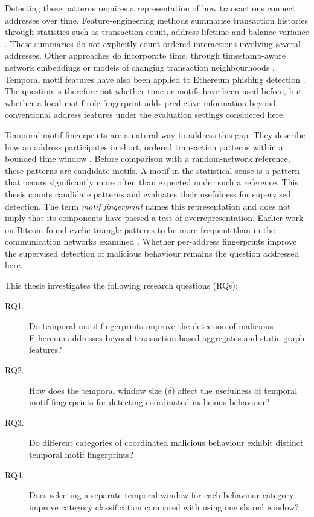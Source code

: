 \documentclass{thesisclass}
\begin{document}
Detecting these patterns requires a representation of how transactions connect addresses over time. Feature-engineering methods summarise transaction histories through statistics such as transaction count, address lifetime and balance variance \citep{chen2022phishing, alemari2021labeled}. These summaries do not explicitly count ordered interactions involving several addresses. Other approaches do incorporate time, through timestamp-aware network embeddings or models of changing transaction neighbourhoods \citep{wu2020phishers, ghoshcatalog2025}. Temporal motif features have also been applied to Ethereum phishing detection \citep{wang2023temporal}. The question is therefore not whether time or motifs have been used before, but whether a local motif-role fingerprint adds predictive information beyond conventional address features under the evaluation settings considered here.

Temporal motif fingerprints are a natural way to address this gap. They describe how an address participates in short, ordered transaction patterns within a bounded time window \citep{kovanen2011temporal, paranjape2017motifs}. Before comparison with a random-network reference, these patterns are candidate motifs. A motif in the statistical sense is a pattern that occurs significantly more often than expected under such a reference. This thesis counts candidate patterns and evaluates their usefulness for supervised detection. The term \emph{motif fingerprint} names this representation and does not imply that its components have passed a test of overrepresentation. Earlier work on Bitcoin found cyclic triangle patterns to be more frequent than in the communication networks examined \citep{paranjape2017motifs}. Whether per-address fingerprints improve the supervised detection of malicious behaviour remains the question addressed here.

This thesis investigates the following research questions (RQs):

\begin{description}
    \item[RQ1.] Do temporal motif fingerprints improve the detection of
          malicious Ethereum addresses beyond transaction-based aggregates
          and static graph features?
    \item[RQ2.] How does the temporal window size ($\delta$) affect the usefulness of temporal motif fingerprints for detecting coordinated malicious behaviour?
    \item[RQ3.] Do different categories of coordinated malicious behaviour exhibit distinct temporal motif fingerprints?
    \item[RQ4.] Does selecting a separate temporal window for each behaviour
          category improve category classification compared with using one
          shared window?
\end{description}
\end{document}
